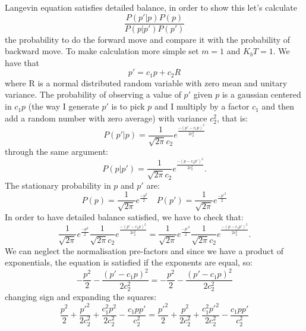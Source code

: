 Langevin equation satisfies detailed balance, in order to show this let's calculate 
    \begin{equation}
        \frac{P(p'|p) P(p)}{P(p|p') P(p')}
    \end{equation}
the probability to do the forward move and compare it with the probability of backward move. To make calculation more simple set $m = 1$ and $K_b T = 1$. We have that 
    \begin{equation}
        p' = c_1 p + c_2 R
    \end{equation}
where R is a normal distributed random variable with zero mean and unitary variance. The probability of observing a value of $p'$ given $p$ is a gaussian centered in $c_1 p$ (the way I generate $p'$ is to pick $p$ and I multiply by a factor $c_1$ and then add a random number with zero average) with variance $c_2^2$, that is:
    \begin{equation}
        P(p'|p) = \frac{1}{\sqrt{2\pi}c_2} e^{\frac{-(p' - c_1 p)^2}{2 c_2^2}}
    \end{equation}
through the same argument:
    \begin{equation}
        P(p|p') = \frac{1}{\sqrt{2\pi}c_2} e^{\frac{-(p - c_1 p')^2}{2 c_2^2}}.
    \end{equation}
The stationary probability in $p$ and $p'$ are:
    \begin{equation}
        P(p) = \frac{1}{\sqrt{2\pi}} e^{\frac{-p^2}{2}}\quad
        P(p') = \frac{1}{\sqrt{2\pi}} e^{\frac{-p'^2}{2}}
    \end{equation}
In order to have detailed balance satisfied, we have to check that:
    \begin{equation}
        \frac{1}{\sqrt{2\pi}} e^{\frac{-p^2}{2}} \frac{1}{\sqrt{2\pi}c_2} e^{\frac{-(p' - c_1 p)^2}{2 c_2^2}} = \frac{1}{\sqrt{2\pi}} e^{\frac{-p'^2}{2}} \frac{1}{\sqrt{2\pi}c_2} e^{\frac{-(p - c_1 p')^2}{2 c_2^2}}.
    \end{equation}
We can neglect the normalisation pre-factors and since we have a product of exponentials, the equation is satisfied if the exponents are equal, so:
    \begin{equation}
       -\frac{p^2}{2} - \frac{(p' - c_1 p)^2}{2 c_2^2} = -\frac{p^2}{2} - \frac{(p' - c_1 p)^2}{2 c_2^2}
    \end{equation}
changing sign and expanding the squares:
    \begin{equation}
        \frac{p^2}{2} + \frac{p'^2}{2 c_2^2} + \frac{c_1^2 p^2}{2 c_2^2} - \frac{c_1 p p'}{c_2^2} = \frac{p'^2}{2} + \frac{p^2}{2 c_2^2} + \frac{c_1^2 p'^2}{2 c_2^2} - \frac{c_1 p p'}{c_2^2}
    \end{equation}
